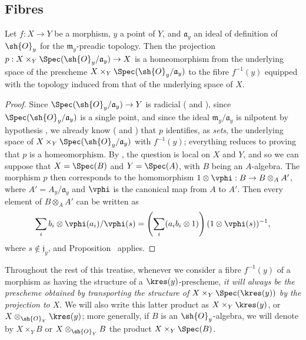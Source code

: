 \subsection{Fibres}
\label{subsection:I.3.6}

\begin{proposition}[3.6.1]
\label{I.3.6.1}
Let $f:X\to Y$ be a morphism, $y$ a point of $Y$, and $\mathfrak{a}_y$ an ideal of definition of $\sh{O}_y$ for the $\mathfrak{m}_y$-preadic topology.
Then the projection $p:X\times_Y\Spec(\sh{O}_y/\mathfrak{a}_y)\to X$ is a homeomorphism from the underlying space of the prescheme $X\times_Y\Spec(\sh{O}_y/\mathfrak{a}_y)$ to the fibre $f^{-1}(y)$ equipped with the topology induced from that of the underlying space of $X$.
\end{proposition}

\begin{proof}
Since $\Spec(\sh{O}_y/\mathfrak{a}_y)\to Y$ is radicial ( and ), since $\Spec(\sh{O}_y/\mathfrak{a}_y)$ is a single point, and since the ideal $\mathfrak{m}_y/\mathfrak{a}_y$ is nilpotent by hypothesis , we already know ( and ) that $p$ identifies, as \emph{sets}, the underlying space of $X\times_Y\Spec(\sh{O}_y/\mathfrak{a}_y)$ with $f^{-1}(y)$; everything reduces to proving that $p$ is a homeomorphism.
By , the question is local on $X$ and $Y$, and so we can suppose that $X=\Spec(B)$ and $Y=\Spec(A)$, with $B$ being an $A$-algebra.
The morphism $p$ then corresponds to the homomorphism $1\otimes\vphi:B\to B\otimes_A A'$, where $A'=A_y/\mathfrak{a}_y$ and $\vphi$ is the canonical map from $A$ to $A'$.
Then every element of $B\otimes_A A'$ can be written as
\[
  \sum_i b_i\otimes\vphi(a_i)/\vphi(s)=\left(\sum_i(a_ib_i\otimes1)\right)(1\otimes\vphi(s))^{-1},
\]
where $s\not\in\mathfrak{j}_y$, and Proposition~ applies.
\end{proof}

\begin{env}[3.6.2]
\label{I.3.6.2}
Throughout the rest of this treatise, whenever we consider a fibre $f^{-1}(y)$ of a morphism as having the structure of a $\kres(y)$-prescheme, \emph{it will always be the prescheme obtained by transporting the structure of $X\times_Y\Spec(\kres(y))$ by the projection to $X$}.
We will also write this latter product as $X\times_Y\kres(y)$, or $X\otimes_{\sh{O}_Y}\kres(y)$; more generally, if $B$ is an $\sh{O}_y$-algebra, we will denote by $X\times_Y B$ or $X\otimes_{\sh{O}_Y}B$ the product $X\times_Y\Spec(B)$.
\end{env}

